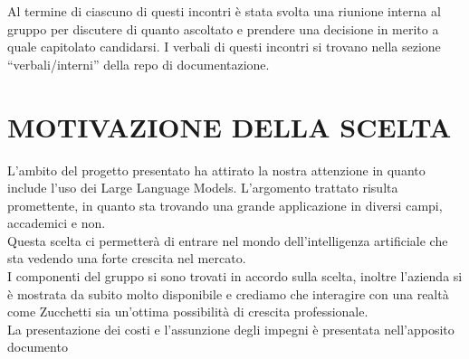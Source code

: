 \documentclass[5pt]{article}
\begin{document}
\medskip
\noindent Al termine di ciascuno di questi incontri è stata svolta una riunione interna al gruppo per discutere di quanto ascoltato e prendere una decisione in merito a quale capitolato candidarsi. I verbali di questi incontri si trovano nella sezione “verbali/interni” della repo di documentazione.

\vspace{20pt}
\section{MOTIVAZIONE DELLA SCELTA}
\noindent L’ambito del progetto presentato ha attirato la nostra attenzione in quanto include l’uso dei Large Language Models. L’argomento trattato risulta promettente, in quanto sta trovando una grande applicazione in diversi campi, accademici e non.\\

\medskip
\noindent Questa scelta ci permetterà di entrare nel mondo dell'intelligenza artificiale che sta vedendo una forte crescita nel mercato.\\

\medskip
\noindent I componenti del gruppo si sono trovati in accordo sulla scelta, inoltre l’azienda si è mostrata da subito molto disponibile e crediamo che interagire con una realtà come Zucchetti sia un’ottima possibilità di crescita professionale.\\

\vspace{50pt}
\noindent La presentazione dei costi e l’assunzione degli impegni è presentata nell’apposito documento

\end{document}
